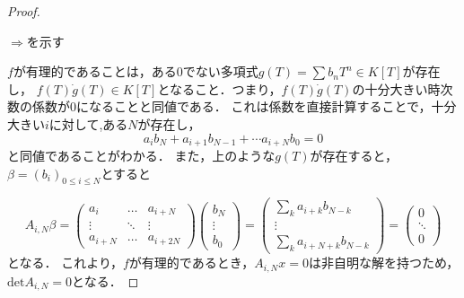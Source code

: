 \documentclass{ujarticle}
\begin{document}
\begin{proof}

  \begin{description}
    \item[$\Rightarrow$を示す]
  \end{description}
  $f$が有理的であることは，ある0でない多項式$g(T) = \sum b_n T^n \in K[T]$が存在し，
  $f(T) \dot g(T) \in K[T]$となること．つまり，$f(T) \dot g(T)$の十分大きい時次数の係数が$0$になることと同値である．
  これは係数を直接計算することで，十分大きい$i$に対して,ある$N$が存在し，
  \begin{equation*}
   a_ib_N + a_{i+1}b_{N-1} + \cdots a_{i + N}b_0 = 0
  \end{equation*}
  と同値であることがわかる．
  また，上のような$g(T)$が存在すると，$\beta =(b_i)_{0 \le  i \le N}$とすると

  \begin{equation*}
    A_{i,N} \beta =
    \begin{pmatrix}
      a_{i} &  \dots & a_{i+N} \\
      \vdots &  \ddots & \vdots \\
      a_{i+N} & \dots & a_{i + 2N}
    \end{pmatrix}
    \begin{pmatrix}
    b_N \\
    \vdots \\
     b_0
    \end{pmatrix}
    =
    \begin{pmatrix}
    \sum_k a_{i+k}b_{N-k} \\
     \vdots \\
     \sum_k a_{i+N+k}b_{N-k}
    \end{pmatrix}
    =
    \begin{pmatrix}
      0 \\
     \ddots \\
      0
    \end{pmatrix}
\end{equation*}
となる．
これより，$f$が有理的であるとき，$A_{i,N}x=0$は非自明な解を持つため，
$\mathrm{det}A_{i,N}=0$となる．


\end{proof}
\end{document}
